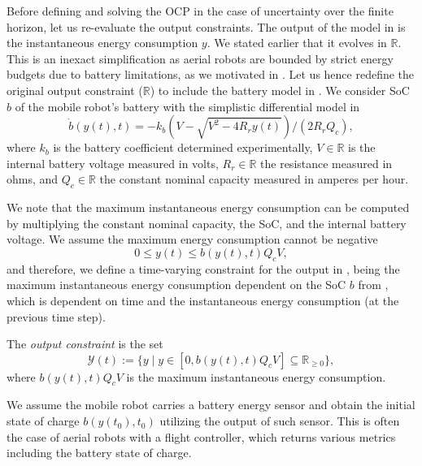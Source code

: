 Before defining and solving the OCP in the case of uncertainty over the finite horizon, let us re-evaluate the output constraints. The output of the model in  is the instantaneous energy consumption $y$. We stated earlier that it evolves in $\mathbb{R}$. This is an inexact simplification as aerial robots are bounded by strict energy budgets due to battery limitations, as we motivated in . Let us hence redefine the original output constraint ($\mathbb{R}$) to include the battery model in . We consider SoC $b$ of the mobile robot's battery with the simplistic differential model in 
\begin{equation}\label{eq:bat}
  \dot{b}(y(t),t)=-k_b\left(V-
  \sqrt{
    V^2-
    4R_ry(t)}
  \right)/(2R_rQ_c),
\end{equation}
where $k_b$ is the battery coefficient determined experimentally,  $V\in\mathbb{R}$ is the internal battery voltage measured in volts, $R_r\in\mathbb{R}$ the resistance measured in ohms, and $Q_c\in\mathbb{R}$ the constant nominal capacity measured in amperes per hour. 

We note that the maximum instantaneous energy consumption can be computed by multiplying the constant nominal capacity, the SoC, and the internal battery voltage. We assume the maximum energy consumption cannot be negative
\begin{equation}
  0\leq y(t)\leq b(y(t),t)Q_cV,
\end{equation}
and therefore, we define a time-varying constraint for the output in , being the maximum instantaneous energy consumption dependent on the SoC $b$ from , which is dependent on time and the instantaneous energy consumption (at the previous time step).

\begin{highlight}
\begin{defn}\label{def:const}
The \emph{output constraint} is the set
\begin{equation*}
  \mathcal{Y}(t):=\{y\mid y\in[0,b(y(t),t)Q_cV]\subseteq{\mathbb{R}_{\geq 0}}\},
\end{equation*}
where $b(y(t),t)Q_cV$ is the maximum instantaneous energy consumption.
\end{defn}
\end{highlight}

We assume the mobile robot carries a battery energy sensor and obtain the initial state of charge $b(y(t_0),t_0)$ utilizing the output of such sensor. This is often the case of aerial robots with a flight controller, which returns various metrics including the battery state of charge. 

